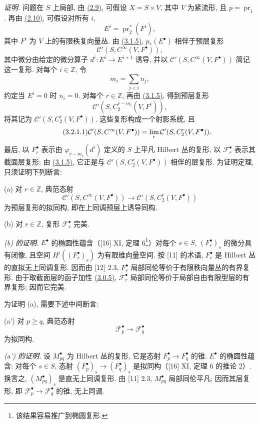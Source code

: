 \emph{证明.} 问题在 $S$ 上局部, 由 \hyperlink{sga6.e02.cor.2-9}{(2.9)}, 可假设 $X=S\times V$, 其中 $V$ 为紧流形, 且 $p=\operatorname{pr}_1$. 再由 \hyperlink{sga6.e02.cor.2-10}{(2.10)}, 可假设对所有 $i$,
\[
 E^i=\operatorname{pr}_2^*(F^i),
\]
其中 $F^i$ 为 $V$ 上的有限秩复向量丛. 由 \hyperlink{sga6.e02.para.3-1-5}{(3.1.5)}, $p_*(E^\bullet)$ 相伴于预层复形
\[
 \mathcal C'(S,C^\infty(V,F^\bullet)),
\]
其中微分由给定的微分算子 $d^i:E^i\to E^{i+1}$ 诱导, 并以 $\mathcal C'(S,C^\infty(V,F^\bullet))$ 简记这一复形. 对每个 $i\in\mathbb Z$, 令
\[
 m_i=\sum_{j<i}n_j,
\]
约定当 $E^i=0$ 时 $n_i=0$. 对每个 $r\in\mathbb Z$, 再由 \hyperlink{sga6.e02.para.3-1-5}{(3.1.5)}, 得到预层复形
\[
 \mathcal C'(S,C_2^{r-m_i}(V,F^i)),
\]
将其记为 $\mathcal C'(S,C_2^{r}(V,F^\bullet))$. 这些复形构成一个射影系统, 且
\begin{equation}\tag{3.2.1.1}
 \mathcal C'(S,C^\infty(V,F^\bullet))
 =\operatorname*{lim}_r \mathcal C'(S,C_2^{r}(V,F^\bullet)).
\end{equation}
最后, 以 $F_r^\bullet$ 表示由 $\varphi_{r-m_i}(d^i)$ 定义的 $S$ 上平凡 Hilbert 丛的复形, 以 $\mathcal F_r^\bullet$ 表示其截面层复形; 由 \hyperlink{sga6.e02.para.3-1-5}{(3.1.5)}, 它正是与 $\mathcal C'(S,C_2^{r}(V,F^\bullet))$ 相伴的层复形. 为证明定理, 只须证明下列断言:

(a) 对 $r\in\mathbb Z$, 典范态射
\[
 \mathcal C'(S,C^\infty(V,F^\bullet))\longrightarrow \mathcal C'(S,C_2^{r}(V,F^\bullet))
\]
为预层复形的拟同构, 即在上同调预层上诱导同构.

(b) 对 $r\in\mathbb Z$, 复形 $\mathcal F_r^\bullet$ 完美.

\emph{(b) 的证明.} $E^\bullet$ 的椭圆性蕴含（[16] XI, 定理 6\footnote{该结果容易推广到椭圆复形.}）对每个 $s\in S$, $(F_r^\bullet)_s$ 的微分具有闭像, 且空间 $H^i((F_r^\bullet)_s)$ 为有限维向量空间. 按 [11] 的术语, $F_r^\bullet$ 是 Hilbert 丛的直拟无上同调复形. 因而由 [12] 2.3, $F_r^\bullet$ 局部同伦等价于有限秩向量丛的有界复形. 由于取截面层的函子加性 \hyperlink{sga6.e02.para.3-0-5}{(3.0.5)}, $\mathcal F_r^\bullet$ 局部同伦等价于局部自由有限型层的有界复形; 因而它完美.

为证明 (a), 需要下述中间断言:

(a') 对 $p\ge q$, 典范态射
\[
 \mathcal F_p^\bullet\longrightarrow \mathcal F_q^\bullet
\]
为拟同构.

\emph{(a') 的证明.} 设 $M_{pq}^\bullet$ 为 Hilbert 丛的复形, 它是态射 $F_p^\bullet\to F_q^\bullet$ 的锥. $E^\bullet$ 的椭圆性蕴含: 对每个 $s\in S$, 态射 $(F_p^\bullet)_s\to(F_q^\bullet)_s$ 是拟同构（[16] XI, 定理 6 的推论 2）. 换言之, $(M_{pq}^\bullet)_s$ 是直无上同调复形. 由 [11] 2.3, $M_{pq}^\bullet$ 局部同伦平凡; 因而其层复形, 即 $\mathcal F_p^\bullet\to\mathcal F_q^\bullet$ 的锥, 无上同调.

